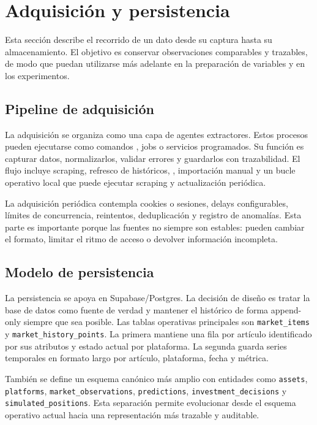 \section{Adquisición y persistencia}

Esta sección describe el recorrido de un dato desde su captura hasta su almacenamiento. El objetivo es conservar observaciones comparables y trazables, de modo que puedan utilizarse más adelante en la preparación de variables y en los experimentos.

\subsection{Pipeline de adquisición}

La adquisición se organiza como una capa de agentes extractores. Estos procesos pueden ejecutarse como comandos , jobs o servicios programados. Su función es capturar datos, normalizarlos, validar errores y guardarlos con trazabilidad. El flujo incluye scraping, refresco de históricos, , importación manual y un bucle operativo local que puede ejecutar scraping y actualización periódica.

La adquisición periódica contempla cookies o sesiones, delays configurables, límites de concurrencia, reintentos, deduplicación y registro de anomalías. Esta parte es importante porque las fuentes no siempre son estables: pueden cambiar el formato, limitar el ritmo de acceso o devolver información incompleta.

\subsection{Modelo de persistencia}

La persistencia se apoya en Supabase/Postgres. La decisión de diseño es tratar la base de datos como fuente de verdad y mantener el histórico de forma append-only siempre que sea posible. Las tablas operativas principales son \texttt{market\_items} y \texttt{market\_history\_points}. La primera mantiene una fila por artículo identificado por sus atributos y estado actual por plataforma. La segunda guarda series temporales en formato largo por artículo, plataforma, fecha y métrica.

También se define un esquema canónico más amplio con entidades como \texttt{assets}, \texttt{platforms}, \texttt{market\_observations}, \texttt{predictions}, \texttt{investment\_decisions} y \texttt{simulated\_positions}. Esta separación permite evolucionar desde el esquema operativo actual hacia una representación más trazable y auditable.

